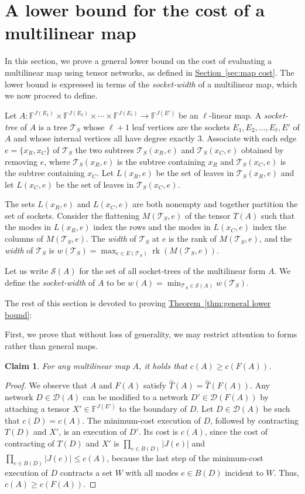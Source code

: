 \documentclass[11pt]{article}
\numberwithin{equation}{section}
\newtheorem{claim}[theorem]{Claim}
\theoremstyle{definition}
\theoremstyle{plain}
\newcommand{\expref}[2]{\hyperref[#2]{#1~\ref{#2}}}
\newcommand{\rk}{\ensuremath{\operatorname{rk}}}
\newcommand{\F}{\ensuremath{\mathbb{F}}}
\newcommand{\ts}{\ensuremath{\mathcal{T}_S}}
\begin{document}
\section{A lower bound for the cost of a multilinear map}
\label{sec:general lower bound}

In this section, we prove a general lower bound on the cost of
evaluating a multilinear map using tensor networks, as defined in
\expref{Section}{sec:map cost}.  The lower bound is expressed in terms of the \emph{socket-width} of a multilinear map, which we
now proceed to define.

Let $A:\F^{J(E_1)}\times\F^{J(E_2)}\times\cdots \times\F^{J(E_\ell)}
\rightarrow \F^{J(E')}$ be an $\ell$-linear map.  A \emph{socket-tree}
of $A$ is a tree $\ts$ whose $\ell+1$ leaf vertices are the sockets
$E_1,E_2,\ldots,E_\ell, E'$ of $A$ and whose internal vertices all have
degree exactly $3$.  Associate with each edge $e = \{x_R, x_C\}$ of $\ts$
the two subtrees $\ts(x_R, e)$ and $\ts(x_C, e)$ obtained by
removing $e$, where $\ts(x_R, e)$ is the subtree containing $x_R$ and $\ts(x_C,
e)$ is the subtree containing $x_C$.  Let $L(x_R, e)$
be the set of leaves in $\ts(x_R, e)$ and let $L(x_C, e)$
be the set of leaves in $\ts(x_C, e)$.

The sets $L(x_R, e)$ and $L(x_C,e)$ are both nonempty and together
partition the set of sockets.  Consider the flattening $M(\ts,e)$ of the tensor $T(A)$ such that the modes in
$L(x_R,e)$ index the rows and the modes in  $L(x_C,e)$ index
the columns of $M(\ts,e)$.  The \emph{width} of $\ts$ at $e$ is the
rank of $M(\ts, e)$, and the \emph{width} of $\ts$ is
$w(\ts)=\max_{e\in E(\ts)} \rk(M(\ts,e))$.

Let us write $\mathscr{S}(A)$ for the set of all socket-trees of the
multilinear form $A$.  We define the \emph{socket-width} of $A$ to be
$w(A)=\min_{\ts\in\mathscr{S}(A)} w(\ts)$.

The rest of this section is devoted to proving \expref{Theorem}{thm:general lower bound}:

\GeneralLowerBoundTheorem*

First, we prove that without loss of generality, we may restrict
attention to forms rather than general maps.

\begin{claim}
For any multilinear map $A$, it holds that $c(A) \ge c(F(A))$.
\end{claim}
\begin{proof}
We observe that $A$ and $F(A)$ satisfy $\hat{T}(A)=\hat{T}(F(A))$. Any network
$D\in \mathscr{D}(A)$ can be modified to a network
$D'\in \mathscr{D}(F(A))$ by attaching a tensor $X' \in \F^{J(E')}$ to the boundary
of $D$. Let $D\in \mathscr{D}(A)$ be such that
$c(D)=c(A)$. The minimum-cost execution of $D$, followed
by contracting $T(D)$ and $X'$, is an execution of $D'$. Its
cost is $c(A)$, since the cost of contracting of $T(D)$ and $X'$ is $\prod_{e \in B(D)} |J(e)|$ and $\prod_{e \in B(D)} |J(e)| \leq c(A)$, because the last step of the minimum-cost execution of $D$ contracts a set $W$ with all modes $e \in B(D)$ incident to $W$. Thus, $c(A)\ge c(F(A))$.
\end{proof}
\end{document}
